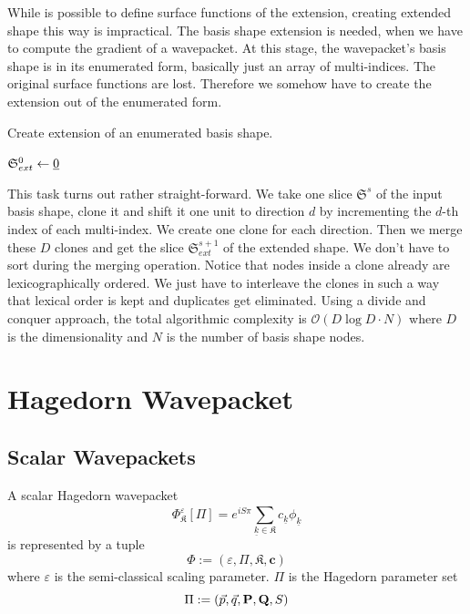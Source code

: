 \documentclass{article}
\begin{document}
While is possible to define surface functions of the extension,
creating extended shape this way is impractical.
The basis shape extension is needed, when
we have to compute the gradient of a wavepacket. At this stage,
the wavepacket's basis shape is in its enumerated form,
basically just an array of multi-indices. The original surface functions 
are lost. Therefore we somehow have to create the extension out
of the enumerated form.

\begin{algorithm}[H]
  \caption{Create extension of an enumerated basis shape.}
  \(\mathfrak{S}_{ext}^0 \leftarrow \underline{0}\)\;
\end{algorithm}

This task turns out rather straight-forward. We take one slice \(\mathfrak{S}^s\) of
the input basis shape, clone it and
shift it one unit to direction \(d\) by incrementing the \(d\)-th index of each multi-index.
We create one clone for each direction. Then we merge these \(D\) clones and get the
slice \(\mathfrak{S}_{ext}^{s+1}\) of the extended shape. We don't have to sort
during the merging operation.
Notice that nodes inside a clone already are lexicographically ordered.
We just have to interleave the clones in such a way that
lexical order is kept and duplicates get eliminated.
Using a divide and conquer approach, the total algorithmic complexity is
\(\mathcal{O}(D\log{}D \cdot N)\) where \(D\) is the dimensionality and \(N\)
is the number of basis shape nodes.

\section{Hagedorn Wavepacket}
\subsection{Scalar Wavepackets}
A scalar Hagedorn wavepacket
\[
  \Phi_{\mathfrak{K}}^{\varepsilon}[\Pi] = e^{iS\pi} \sum_{\underline{k} \in
    \mathfrak{K}}^{} c_{\underline{k}} \phi_{\underline{k}} \]
is represented by a tuple
\[ \Phi := \left( \varepsilon, \Pi, \mathfrak{K}, \boldsymbol{c}
  \right) \]
where \(\varepsilon\) is the semi-classical scaling parameter.
\(\Pi\) is the Hagedorn parameter set
\[ \Pi := \left( \vec{p}, \vec{q}, \mathbf{P}, \mathbf{Q}, S \right) \]
\end{document}
